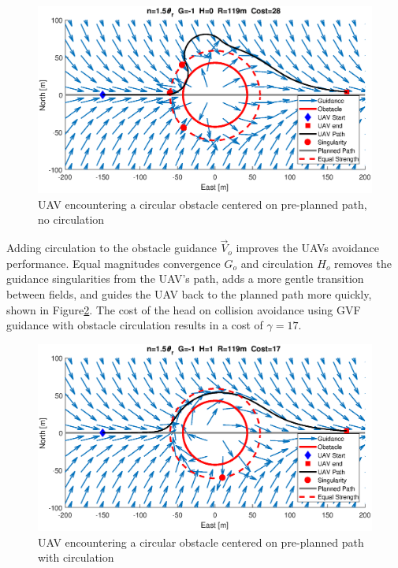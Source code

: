 \documentclass[numbered,pdftex]{ohio-etd}
\begin{document}
\begin{figure}[H]
	\centering
	\includegraphics[width=14cm]{PaperFigures/Methods/uavPathFollowObstacleNoCirc}
	\caption{UAV encountering a circular obstacle centered on pre-planned path, no circulation}
	\label{fig:uavPathObstNoCirc}
\end{figure}

Adding circulation to the obstacle guidance $\overrightarrow{V}_o$ improves the UAVs avoidance performance. Equal magnitudes convergence $G_o$ and circulation $H_o$ removes the guidance singularities from the UAV's path, adds a more gentle transition between fields, and guides the UAV back to the planned path more quickly, shown in Figure\ref{fig:uavPathObstWithCirc}. The cost of the head on collision avoidance using GVF guidance with obstacle circulation results in a cost of $\gamma=17$.



\begin{figure}[H]
	\centering
	\includegraphics[width=16cm]{PaperFigures/Methods/uavPathFollowObstacleWithCirc}
	\caption{UAV encountering a circular obstacle centered on pre-planned path with circulation}
	\label{fig:uavPathObstWithCirc}
\end{figure}
\end{document}
